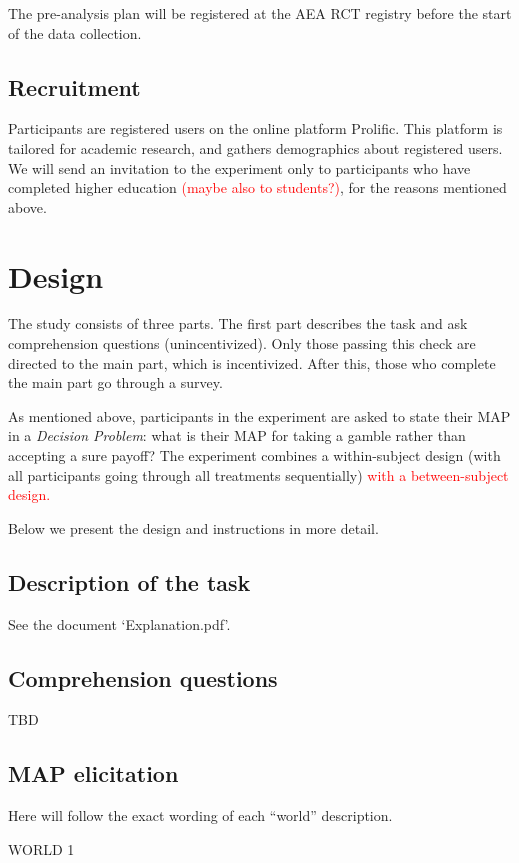 The pre-analysis plan will be registered at the AEA RCT registry before the start of the data collection.

\subsection{Recruitment}
Participants are registered users on the online platform Prolific.
This platform is tailored for academic research, and gathers demographics about registered users.
We will send an invitation to the experiment only to participants who have completed higher education \textcolor{red}{(maybe also to students?)}, for the reasons mentioned above. 



\section{Design}
The study consists of three parts.
The first part describes the task and ask comprehension questions (unincentivized).
Only those passing this check are directed to the main part, which is incentivized.
After this, those who complete the main part go through a survey.

As mentioned above, participants in the experiment are asked to state their MAP in a \textit{Decision Problem}: what is their MAP for taking a gamble rather than accepting a sure payoff?
The experiment combines a within-subject design (with all participants going through all treatments sequentially) \textcolor{red}{with a between-subject design.}

Below we present the design and instructions in more detail.

\subsection{Description of the task}
See the document `Explanation.pdf'.

\subsection{Comprehension questions}
TBD

\subsection{MAP elicitation}
Here will follow the exact wording of each ``world'' description.

WORLD 1

